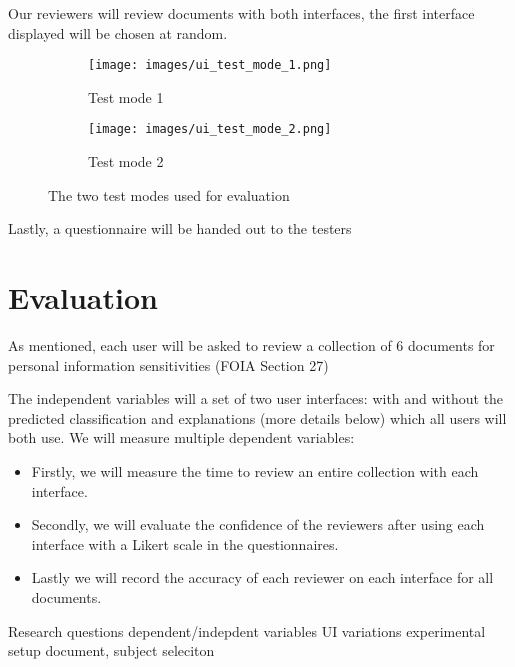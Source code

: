 \documentclass{l4proj}
\begin{document}
Our reviewers will review documents with both interfaces, the first interface displayed will be chosen at random.


\begin{figure}[H]
    \centering
    \begin{subfigure}[b]{0.7\textwidth}
        \centering
        \texttt{[image: images/ui\_test\_mode\_1.png]}
        \caption{Test mode 1}
        \label{fig:test_mode_1}
    \end{subfigure}
    
    
    \begin{subfigure}[b]{0.7\textwidth}
        \centering
        \texttt{[image: images/ui\_test\_mode\_2.png]}
        \caption{Test mode 2}
        \label{fig:test_mode_2}
    \end{subfigure}
    \caption{The two test modes used for evaluation}
    \label{fig:test_modes}
\end{figure}

Lastly, a questionnaire will be handed out to the testers

\section{Evaluation}

As mentioned, each user will be asked to review a collection of 6 documents for personal information sensitivities (FOIA Section 27)

The independent variables will a set of two user interfaces: with and without the predicted classification and explanations (more details below) which all users will both use. We will measure multiple dependent variables:

\begin{itemize}
    \item Firstly, we will measure the time to review an entire collection with each interface.
    \item Secondly, we will evaluate the confidence of the reviewers after using each interface with a Likert scale in the questionnaires.
    \item Lastly we will record the accuracy of each reviewer on each interface for all documents.
\end{itemize}




Research questions
dependent/indepdent variables
UI variations
experimental setup
document, subject seleciton
\end{document}
